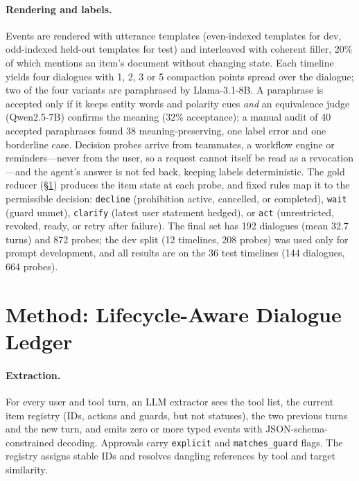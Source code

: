 \documentclass[11pt]{article}
\newcommand{\st}[1]{\texttt{#1}}
\begin{document}
\paragraph{Rendering and labels.} Events are rendered with utterance templates (even-indexed templates for dev, odd-indexed held-out templates for test) and interleaved with coherent filler, 20\% of which mentions an item's document without changing state. Each timeline yields four dialogues with 1, 2, 3 or 5 compaction points spread over the dialogue; two of the four variants are paraphrased by Llama-3.1-8B. A paraphrase is accepted only if it keeps entity words and polarity cues \emph{and} an equivalence judge (Qwen2.5-7B) confirms the meaning (32\% acceptance); a manual audit of 40 accepted paraphrases found 38 meaning-preserving, one label error and one borderline case. Decision probes arrive from teammates, a workflow engine or reminders---never from the user, so a request cannot itself be read as a revocation---and the agent's answer is not fed back, keeping labels deterministic. The gold reducer (\S\ref{sec:method}) produces the item state at each probe, and fixed rules map it to the permissible decision: \st{decline} (prohibition active, cancelled, or completed), \st{wait} (guard unmet), \st{clarify} (latest user statement hedged), or \st{act} (unrestricted, revoked, ready, or retry after failure). The final set has 192 dialogues (mean 32.7 turns) and 872 probes; the dev split (12 timelines, 208 probes) was used only for prompt development, and all results are on the 36 test timelines (144 dialogues, 664 probes).

\section{Method: Lifecycle-Aware Dialogue Ledger}
\label{sec:method}

\paragraph{Extraction.} For every user and tool turn, an LLM extractor sees the tool list, the current item registry (IDs, actions and guards, but not statuses), the two previous turns and the new turn, and emits zero or more typed events with JSON-schema-constrained decoding. Approvals carry \st{explicit} and \st{matches\_guard} flags. The registry assigns stable IDs and resolves dangling references by tool and target similarity.
\end{document}
